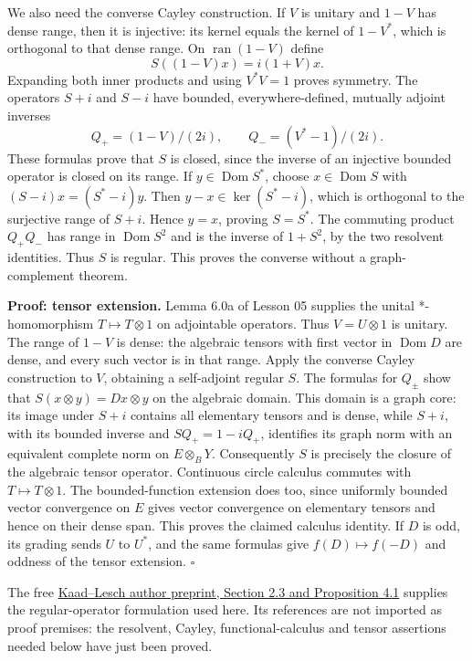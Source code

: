 \documentclass[
  11pt,
]{article}
\begin{document}
We also need the converse Cayley construction. If \(V\) is unitary and
\(1-V\) has dense range, then it is injective: its kernel equals the
kernel of \(1-V^*\), which is orthogonal to that dense range. On
\(\operatorname{ran}(1-V)\) define \[
S((1-V)x)=i(1+V)x.
\] Expanding both inner products and using \(V^*V=1\) proves symmetry.
The operators \(S+i\) and \(S-i\) have bounded, everywhere-defined,
mutually adjoint inverses \[
Q_+=(1-V)/(2i),\qquad Q_-=(V^*-1)/(2i).
\] These formulas prove that \(S\) is closed, since the inverse of an
injective bounded operator is closed on its range. If
\(y\in\operatorname{Dom}S^*\), choose \(x\in\operatorname{Dom}S\) with
\((S-i)x=(S^*-i)y\). Then \(y-x\in\ker(S^*-i)\), which is orthogonal to
the surjective range of \(S+i\). Hence \(y=x\), proving \(S=S^*\). The
commuting product \(Q_+Q_-\) has range in \(\operatorname{Dom}S^2\) and
is the inverse of \(1+S^2\), by the two resolvent identities. Thus \(S\)
is regular. This proves the converse without a graph-complement theorem.

\textbf{Proof: tensor extension.} Lemma 6.0a of Lesson 05 supplies the
unital *-homomorphism \(T\mapsto T\otimes1\) on adjointable operators.
Thus \(V=U\otimes1\) is unitary. The range of \(1-V\) is dense: the
algebraic tensors with first vector in \(\operatorname{Dom}D\) are
dense, and every such vector is in that range. Apply the converse Cayley
construction to \(V\), obtaining a self-adjoint regular \(S\). The
formulas for \(Q_\pm\) show that \(S(x\otimes y)=Dx\otimes y\) on the
algebraic domain. This domain is a graph core: its image under \(S+i\)
contains all elementary tensors and is dense, while \(S+i\), with its
bounded inverse and \(S Q_+=1-iQ_+\), identifies its graph norm with an
equivalent complete norm on \(E\otimes_B Y\). Consequently \(S\) is
precisely the closure of the algebraic tensor operator. Continuous
circle calculus commutes with \(T\mapsto T\otimes1\). The
bounded-function extension does too, since uniformly bounded vector
convergence on \(E\) gives vector convergence on elementary tensors and
hence on their dense span. This proves the claimed calculus identity. If
\(D\) is odd, its grading sends \(U\) to \(U^*\), and the same formulas
give \(f(D)\mapsto f(-D)\) and oddness of the tensor extension.
\(\square\)

The free
\href{https://www.math.uni-bonn.de/people/lesch/dl/pap/2011-KaaLes-ArXiv-v2.pdf}{Kaad--Lesch
author preprint, Section 2.3 and Proposition 4.1} supplies the
regular-operator formulation used here. Its references are not imported
as proof premises: the resolvent, Cayley, functional-calculus and tensor
assertions needed below have just been proved.
\end{document}
